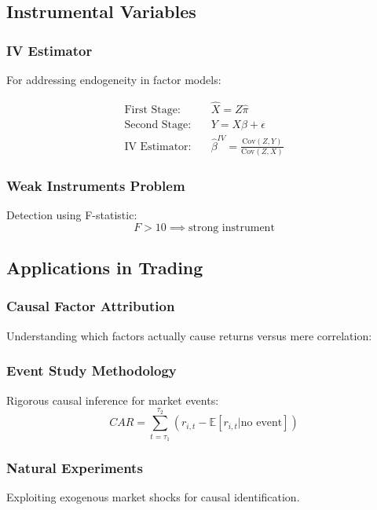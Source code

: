 \documentclass[11pt,letterpaper,openany]{book}
\newcommand{\Cov}{\mathrm{Cov}}
\begin{document}
\subsection{Instrumental Variables}

\subsubsection{IV Estimator}

For addressing endogeneity in factor models:

\begin{align}
\text{First Stage:} \quad & \hat{X} = Z \hat{\pi} \\
\text{Second Stage:} \quad & Y = X \beta + \epsilon \\
\text{IV Estimator:} \quad & \hat{\beta}^{IV} = \frac{\Cov(Z,Y)}{\Cov(Z,X)}
\end{align}

\subsubsection{Weak Instruments Problem}

Detection using F-statistic:
\[
F > 10 \implies \text{strong instrument}
\]

\subsection{Applications in Trading}

\subsubsection{Causal Factor Attribution}

Understanding which factors actually cause returns versus mere correlation:

\subsubsection{Event Study Methodology}

Rigorous causal inference for market events:
\[
CAR = \sum_{t=\tau_1}^{\tau_2} (r_{i,t} - \mathbb{E}[r_{i,t} | \text{no event}])
\]

\subsubsection{Natural Experiments}

Exploiting exogenous market shocks for causal identification.
\end{document}
